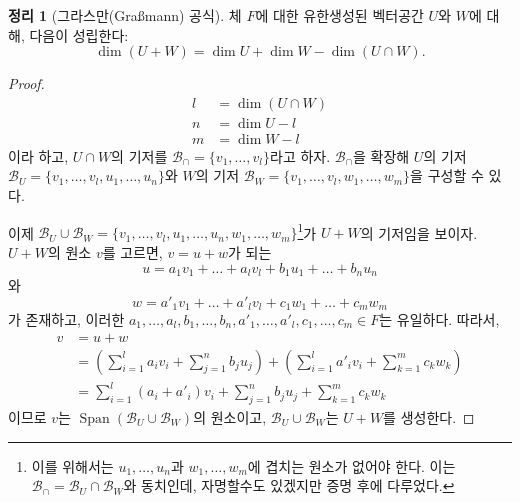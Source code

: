 \documentclass[unfonts,oneside,a4paper]{oblivoir}
\theoremstyle{definition}
\theoremstyle{theorem}
\newtheorem{theorem}{정리}[section]
\theoremstyle{theorem}
\theoremstyle{remark}
\theoremstyle{remark}
\theoremstyle{remark}
\theoremstyle{remark}
\renewcommand{\vec}[1]{\bm{\mathit{#1}}}
\DeclareMathOperator{\Span}{Span}
\begin{document}
\begin{theorem}[그라스만(Graßmann) 공식] \label{thm:grassmann}
    체 $F$에 대한 유한생성된 벡터공간 $U$와 $W$에 대해, 다음이 성립한다:
    \begin{equation*}
        \dim (U + W) = \dim U + \dim W - \dim (U \cap W).
    \end{equation*}
\end{theorem}

\begin{proof}
    \begin{align*}
        l &= \dim (U \cap W)\\
        n &= \dim U - l\\
        m &= \dim W - l
    \end{align*}
    이라 하고, $U \cap W$의 기저를 $\mathcal B_\cap = \{\vec v_1, \dots, \vec v_l\}$라고 하자.
    $\mathcal B_\cap$을 확장해 $U$의 기저 $\mathcal B_U = \{\vec v_1, \dots, \vec v_l, \vec u_1, \dots, \vec u_n\}$와 $W$의 기저 $\mathcal B_W = \{\vec v_1, \dots, \vec v_l, \vec w_1, \dots, \vec w_m\}$을 구성할 수 있다.

    이제 $\mathcal B_U \cup \mathcal B_W = \{\vec v_1, \dots, \vec v_l, \vec u_1, \dots, \vec u_n, \vec w_1, \dots, \vec w_m\}$\footnote{이를 위해서는 $\vec u_1, \dots, \vec u_n$과 $\vec w_1, \dots, \vec w_m$에 겹치는 원소가 없어야 한다.
    이는 $\mathcal B_\cap = \mathcal B_U \cap \mathcal B_W$와 동치인데, 자명할수도 있겠지만 증명 후에 다루었다.}가 $U + W$의 기저임을 보이자.
    $U + W$의 원소 $\vec v$를 고르면, $\vec v = \vec u + \vec w$가 되는
    \[
        \vec u = a_1 \vec v_1 + \dots + a_l \vec v_l + b_1 \vec u_1 + \dots + b_n \vec u_n
    \]
    와
    \[
        \vec w = a'_1 \vec v_1 + \dots + a'_l \vec v_l + c_1 \vec w_1 + \dots + c_m \vec w_m
    \]
    가 존재하고, 이러한 $a_1, \dots, a_l, b_1, \dots, b_n, a'_1, \dots, a'_l, c_1, \dots, c_m \in F$는 유일하다.
    따라서,
    \begin{align*}
        \vec v &= \vec u + \vec w\\
               &= \left(\sum_{i = 1}^l a_i \vec v_i + \sum_{j = 1}^n b_j \vec u_j\right) + \left(\sum_{i = 1}^l a'_i \vec v_i + \sum_{k = 1}^m c_k \vec w_k\right)\\
               &= \sum_{i = 1}^l \left(a_i + a'_i\right) \vec v_i + \sum_{j = 1}^n b_j \vec u_j + \sum_{k = 1}^m c_k \vec w_k
    \end{align*}
    이므로 $\vec v$는 $\Span (\mathcal B_U \cup \mathcal B_W)$의 원소이고, $\mathcal B_U \cup \mathcal B_W$는 $U + W$를 생성한다.


\end{proof}
\end{document}
